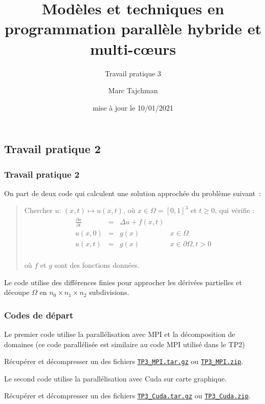 \documentclass{beamer}
\title{Modèles et techniques en programmation parallèle hybride et multi-c\oe urs}
\subtitle{Travail pratique 3}
\author{Marc Tajchman}\institute{CEA - DEN/DM2S/STMF/LMES}
\date{mise à jour le 10/01/2021}
\newcommand\Frac[2]{\frac{\displaystyle #1}{\displaystyle #2}}
\begin{document}
\begin{frame}
	\titlepage
\end{frame}

\large
\begin{frame}
	\section{Travail pratique 2}
	\frametitle{Travail pratique 2}

On part de deux code qui calculent une solution approchée du problème suivant~:

\medskip
\begin{quote}
Chercher $u$:  $(x, t) \mapsto u(x, t)$, où  $x \in \Omega = [0,1]^3$ et $t \geq 0$, qui vérifie :
$$
\begin{array}{lcll}
\Frac{\partial u}{\partial t} & = & \Delta u + f(x, t) & \\[0.3cm]
u(x, 0) &=& g(x) & x\in \Omega \\[0.3cm]
u(x, t) & = & g(x) & x\in\partial \Omega, t > 0\\[0.3cm]
\end{array}
$$

\vspace{-0.6cm}
où $f$ et $g$ sont des fonctions données.
\end{quote}

Le code utilise des différences finies pour approcher les dérivées partielles et découpe $\Omega$ en $n_0\times n_1\times n_2$ subdivisions.

\end{frame}

\begin{frame}
	\frametitle{Codes de départ}
	
   \vfill
	Le premier code utilise la parallélisation avec MPI et la décomposition de domaines
    (ce code parallélisée est similaire au code MPI utilisé dans le TP2)
	
	\medskip
	
	Récupérer et décompresser un des fichiers \href{https://perso.ensta-paris.fr/~tajchman/Seance9/TP3_MPI.tar.gz}{\tt TP3\_MPI.tar.gz} ou \href{https://perso.ensta-paris.fr/~tajchman/Seance9/TP3_MPI.zip}{\tt TP3\_MPI.zip}.
	
   \vfill
    
    Le second code utilise la parallélisation avec Cuda sur carte graphique.
    
	\medskip
	
	Récupérer et décompresser un des fichiers \href{https://perso.ensta-paris.fr/~tajchman/Seance9/TP3_Cuda.tar.gz}{\tt TP3\_Cuda.tar.gz} ou \href{https://perso.ensta-paris.fr/~tajchman/Seance9/TP3_Cuda.zip}{\tt TP3\_Cuda.zip}.

   \vfill
\end{frame}
\end{document}
